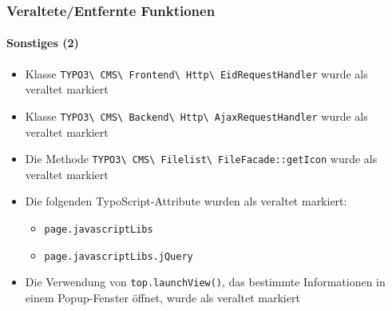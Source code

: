 \begin{frame}[fragile]
	\frametitle{Veraltete/Entfernte Funktionen}
	\framesubtitle{Sonstiges (2)}

	\begin{itemize}
		\item Klasse \texttt{TYPO3\textbackslash
			CMS\textbackslash
			Frontend\textbackslash
			Http\textbackslash
			EidRequestHandler}\newline
			wurde als veraltet markiert

		\item Klasse \texttt{TYPO3\textbackslash
			CMS\textbackslash
			Backend\textbackslash
			Http\textbackslash
			AjaxRequestHandler}\newline
			wurde als veraltet markiert

 		\item Die Methode \texttt{TYPO3\textbackslash
 			CMS\textbackslash
 			Filelist\textbackslash
 			FileFacade::getIcon}\newline
 			wurde als veraltet markiert

		\item Die folgenden TypoScript-Attribute wurden als veraltet markiert:

		\begin{itemize}
			\item \texttt{page.javascriptLibs}
			\item \texttt{page.javascriptLibs.jQuery}
		\end{itemize}

		\item Die Verwendung von \texttt{top.launchView()}, das bestimmte Informationen in einem 
			Popup-Fenster öffnet, wurde als veraltet markiert

	\end{itemize}

\end{frame}


